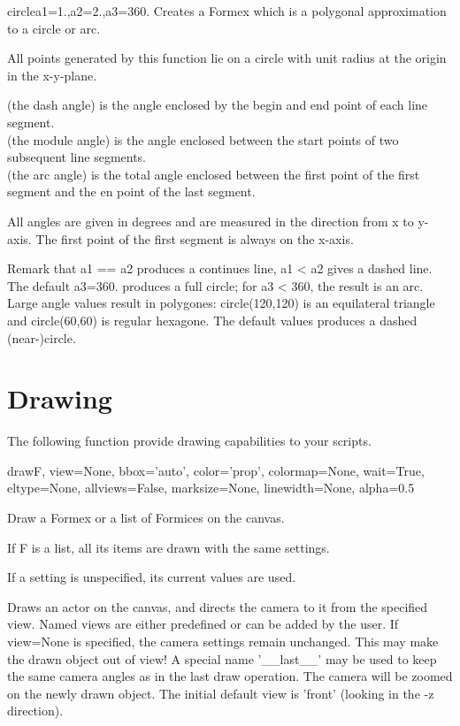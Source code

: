 {{{\begin{funcdesc}{circle}{a1=1.,a2=2.,a3=360.}
Creates a Formex which is a polygonal approximation to a circle or arc.

All points generated by this function lie on a circle with unit radius at the origin in the x-y-plane.

 (the dash angle) is the angle enclosed by the begin and end point of each line segment.\\
 (the module angle) is the angle enclosed between the start points of two subsequent line segments.\\
 (the arc angle) is the total angle enclosed between the first point of the first segment and the en point of the last segment.

All angles are given in degrees and are measured in the direction from x to y-axis. The first point of the first segment is always on the x-axis.

Remark that a1 == a2 produces a continues line, a1 < a2 gives a dashed line.
The default a3=360. produces a full circle; for a3 < 360, the result is an arc.
Large angle values result in polygones: circle(120,120) is an equilateral triangle and circle(60,60) is regular hexagone. The default values produces a dashed (near-)circle.

\end{funcdesc}



\section{Drawing}
\label{sec:drawing}

The following function provide drawing capabilities to your scripts.

 
\begin{funcdesc}{draw}{F, view=None, bbox='auto', color='prop', colormap=None, wait=True, eltype=None, allviews=False, marksize=None, linewidth=None, alpha=0.5}

Draw a Formex or a list of Formices on the canvas.

    If F is a list, all its items are drawn with the same settings.

    If a setting is unspecified, its current values are used.
    
    Draws an actor on the canvas, and directs the camera to it from
    the specified view. Named views are either predefined or can be added by
    the user.
    If view=None is specified, the camera settings remain unchanged.
    This may make the drawn object out of view!
    A special name '__last__' may be used to keep the same camera angles
    as in the last draw operation. The camera will be zoomed on the newly
    drawn object.
    The initial default view is 'front' (looking in the -z direction).


\end{funcdesc}}}}
